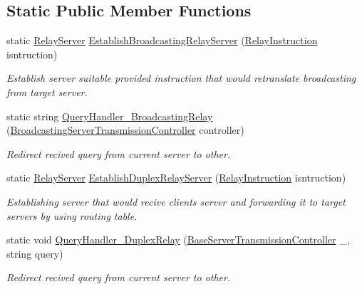 \subsection*{Static Public Member Functions}
\begin{DoxyCompactItemize}
\item 
static \mbox{\hyperlink{class_uniform_server_1_1_standard_1_1_relay_server}{Relay\+Server}} \mbox{\hyperlink{class_uniform_server_1_1_standard_1_1_relay_server_a95fbce307be04e63d120a674f7bde0f3}{Establish\+Broadcasting\+Relay\+Server}} (\mbox{\hyperlink{class_pipes_provider_1_1_networking_1_1_routing_1_1_relay_instruction}{Relay\+Instruction}} isntruction)
\begin{DoxyCompactList}\small\item\em Establish server suitable provided instruction that would retranslate broadcasting from target server. \end{DoxyCompactList}\item 
static string \mbox{\hyperlink{class_uniform_server_1_1_standard_1_1_relay_server_a5306cb2ee3b40c50785283c4d4e5d387}{Query\+Handler\+\_\+\+Broadcasting\+Relay}} (\mbox{\hyperlink{class_pipes_provider_1_1_server_1_1_transmission_controllers_1_1_broadcasting_server_transmission_controller}{Broadcasting\+Server\+Transmission\+Controller}} controller)
\begin{DoxyCompactList}\small\item\em Redirect recived query from current server to other. \end{DoxyCompactList}\item 
static \mbox{\hyperlink{class_uniform_server_1_1_standard_1_1_relay_server}{Relay\+Server}} \mbox{\hyperlink{class_uniform_server_1_1_standard_1_1_relay_server_a6a3e3701a479f5ee4846d79c4a153f7e}{Establish\+Duplex\+Relay\+Server}} (\mbox{\hyperlink{class_pipes_provider_1_1_networking_1_1_routing_1_1_relay_instruction}{Relay\+Instruction}} isntruction)
\begin{DoxyCompactList}\small\item\em Establishing server that would recive client\textquotesingle{}s server and forwarding it to target servers by using routing table. \end{DoxyCompactList}\item 
static void \mbox{\hyperlink{class_uniform_server_1_1_standard_1_1_relay_server_a96a666ec31626f2e1a3f2f1d4d444366}{Query\+Handler\+\_\+\+Duplex\+Relay}} (\mbox{\hyperlink{class_pipes_provider_1_1_server_1_1_transmission_controllers_1_1_base_server_transmission_controller}{Base\+Server\+Transmission\+Controller}} \+\_\+, string query)
\begin{DoxyCompactList}\small\item\em Redirect recived query from current server to other. \end{DoxyCompactList}\end{DoxyCompactItemize}
